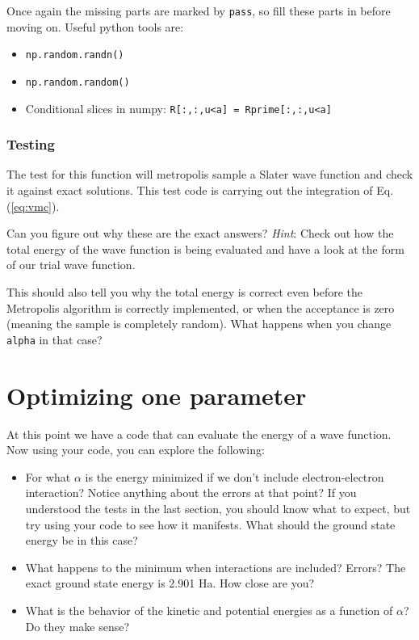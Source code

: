 \documentclass[12pt]{article}
\begin{document}
Once again the missing parts are marked by \verb|pass|, so fill these parts in before moving on. 
Useful python tools are:
\begin{itemize}
\item \verb|np.random.randn()|
\item \verb|np.random.random()|
\item Conditional slices in numpy: \verb|R[:,:,u<a] = Rprime[:,:,u<a]|
\end{itemize}

\subsubsection{Testing}

The test for this function will metropolis sample a Slater wave function and check it against exact solutions. 
This test code is carrying out the integration of Eq. (\ref{eq:vmc}).

Can you figure out why these are the exact answers?
\textit{Hint}: Check out how the total energy of the wave function is being evaluated and have a look at the form of our trial wave function. 

This should also tell you why the total energy is correct even before the Metropolis algorithm is correctly implemented, or when the acceptance is zero (meaning the sample is completely random).
What happens when you change \verb|alpha| in that case?

\section{Optimizing one parameter}

At this point we have a code that can evaluate the energy of a wave function.
Now using your code, you can explore the following:
\begin{itemize}
\item For what $\alpha$ is the energy minimized if we don't include electron-electron interaction? Notice anything about the errors at that point?
  If you understood the tests in the last section, you should know what to expect, but try using your code to see how it manifests.
    What should the ground state energy be in this case?
\item What happens to the minimum when interactions are included? Errors?
  The exact ground state energy is 2.901 Ha. How close are you?
\item What is the behavior of the kinetic and potential energies as a function of $\alpha$? Do they make sense?	
\end{itemize}
\end{document}
